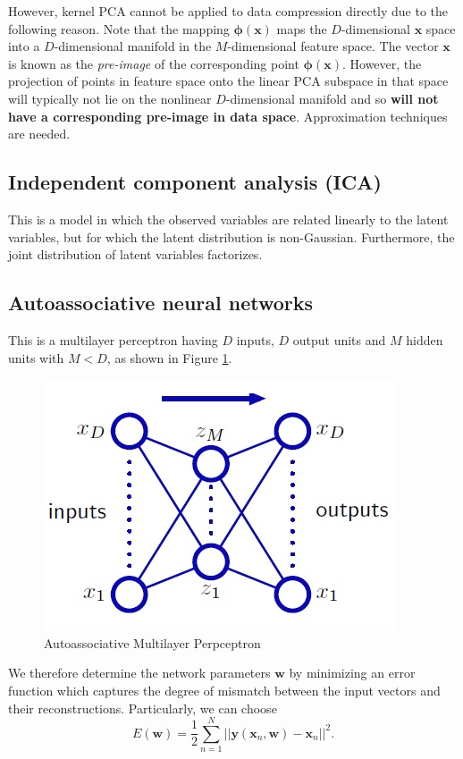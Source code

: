\documentclass[a4paper]{report}
\renewcommand{\bf}{\mathbf}
\newcommand{\imp}[1]{{\color{blue}\textit{#1}}}
\newcommand{\bs}{\boldsymbol}
\begin{document}
However, kernel PCA cannot be applied to data compression directly due to the following reason. Note that the mapping $\bs{\phi}(\bf{x})$ maps the $D$-dimensional $\bf{x}$ space into a $D$-dimensional manifold in the $M$-dimensional feature space. The vector $\bf{x}$ is known as the \imp{pre-image} of the corresponding point $\bf{\phi}(\bf{x})$. However, the projection of points in feature space onto the linear PCA subspace in that space will typically not lie on the nonlinear $D$-dimensional manifold and so \textbf{will not have a corresponding pre-image in data space}. Approximation techniques are needed.

\subsection{Independent component analysis (ICA)}
This is a model in which the observed variables are related linearly to the latent variables, but for which the latent distribution is non-Gaussian. Furthermore, the joint distribution of latent variables factorizes.
\subsection{Autoassociative neural networks}
This is a multilayer perceptron having $D$ inputs, $D$ output units and $M$ hidden units with $M < D$, as shown in Figure \ref{ANN}.
\begin{figure}
	\centering
	\includegraphics[scale=0.5]{ANN}
	\caption{Autoassociative Multilayer Perpceptron} \label{ANN}
\end{figure}

We therefore determine the network parameters $\bf{w}$ by minimizing an error function which captures the degree of mismatch between the input vectors and their reconstructions. Particularly, we can choose
\begin{equation}
E(\bf{w}) = \frac{1}{2} \sum_{n=1}^N ||\bf{y}(\bf{x}_n,\bf{w})-\bf{x}_n||^2.
\end{equation}
\end{document}
